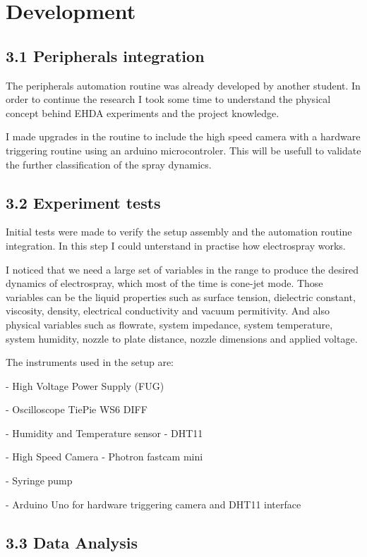 \section{Development}

\subsection*{3.1 Peripherals integration}

The peripherals automation routine was already developed by another student. 
In order to continue the research I took some time to understand the physical concept 
behind EHDA experiments and the project knowledge.

I made upgrades in the routine to include the high speed camera with a hardware triggering routine using an
arduino microcontroler. This will be usefull to validate the further classification of the spray dynamics.


\subsection*{3.2 Experiment tests}

Initial tests were made to verify the setup assembly and the automation routine integration. 
In this step I could unterstand in practise how electrospray works.

I noticed that we need a large set of variables in the range to produce the desired dynamics of electrospray, which most of the time is cone-jet mode.
Those variables can be the liquid properties such as surface tension, dielectric constant, viscosity, density, electrical conductivity and vacuum permitivity.
And also physical variables such as flowrate, system impedance, system temperature, system humidity, nozzle to plate distance, nozzle dimensions and applied voltage.

The instruments used in the setup are:

  - High Voltage Power Supply (FUG)

  - Oscilloscope TiePie WS6 DIFF

  - Humidity and Temperature sensor - DHT11

  - High Speed Camera - Photron fastcam mini

  - Syringe pump

  - Arduino Uno for hardware triggering camera and DHT11 interface


\subsection*{3.3 Data Analysis}

